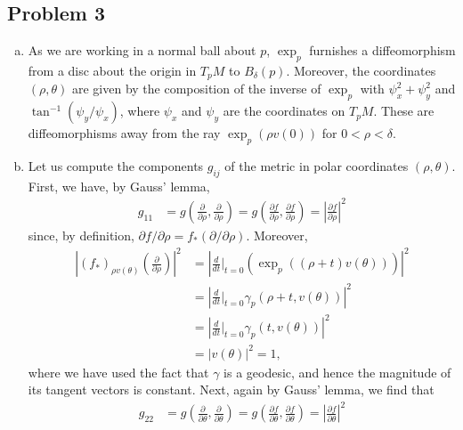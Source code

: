 \documentclass{../mathnotes}
\begin{document}
\subsection*{Problem 3}
\begin{enumerate}[(a)]
    \item As we are working in a normal ball about $p$, $\exp_p$ furnishes a diffeomorphism
        from a disc about the origin in $T_pM$ to $B_\delta(p)$. Moreover, the coordinates
        $(\rho,\theta)$ are given by the composition of the inverse of $\exp_p$ with
        $\psi_x^2+\psi_y^2$ and $\tan^{-1}\left( \psi_y/\psi_x \right)$, where $\psi_x$ and
        $\psi_y$ are the coordinates on $T_pM$. These are diffeomorphisms away
        from the ray $\exp_p(\rho v(0))$ for $0<\rho<\delta$.
    \item Let us compute the components $g_{ij}$ of the metric in polar
        coordinates $(\rho,\theta)$. First, we have, by Gauss' lemma, 
        \begin{align*}
            g_{11}&=g\left( \frac{\partial}{\partial \rho},\frac{\partial}{\partial\rho}\right)
            = g\left( \frac{\partial f}{\partial \rho},\frac{\partial  f}{\partial\rho} \right)
            =\left|\frac{\partial f}{\partial\rho}\right|^2
        \end{align*}
        since, by definition, $\partial f/\partial\rho=f_*(\partial/\partial\rho)$. Moreover,
        \begin{align*}
            \left|(f_*)_{\rho v(\theta)}\left( \frac{\partial}{\partial\rho} \right)\right|^2&=\left|\frac{d}{dt}\bigg|_{t=0}\left( \exp_p\left( (\rho +t)v(\theta) \right) \right)\right|^2\\
            &=\left|\frac{d}{dt}\bigg|_{t=0}\gamma_p(\rho+t,v(\theta))\right|^2\\
            &=\left|\frac{d}{dt}\bigg|_{t=0}\gamma_p(t,v(\theta))\right|^2\\
            &=\left|v(\theta)\right|^2=1,
        \end{align*}
        where we have used the fact that $\gamma$ is a geodesic, and hence the
        magnitude of its tangent vectors is constant. Next, again by Gauss' lemma,
        we find that
        \begin{align*}
            g_{22} &= g\left( \frac{\partial}{\partial\theta}, \frac{\partial}{\partial\theta} \right)
            =g\left( \frac{\partial f}{\partial\theta},\frac{\partial f}{\partial\theta} \right)
            =\left|\frac{\partial f}{\partial\theta}\right|^2
        \end{align*}

\end{enumerate}
\end{document}
